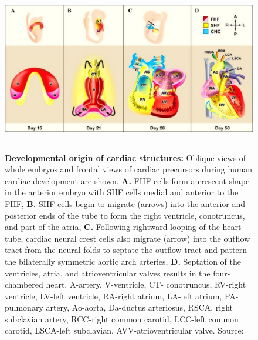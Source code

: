 \begin{refsection}
\begin{figure}[!tb]
\centering
\includegraphics[scale=0.5,keepaspectratio]{Figures/Figure1_1.pdf}
\rule{35em}{0.5pt}
\caption[Developmental origin of cardiac structures]{\textbf{Developmental origin of cardiac structures:} Oblique views of whole embryos and frontal views of cardiac precursors during human cardiac development are shown. \textbf{A.} FHF cells form a crescent shape in the anterior embryo with SHF cells medial and anterior to the FHF, \textbf{B.} SHF cells begin to migrate (arrows) into the anterior and posterior ends of the tube to form the right ventricle, conotruncus, and part of the atria, \textbf{C.} Following rightward looping of the heart tube, cardiac neural crest cells also migrate (arrow) into the outflow tract from the neural folds to septate the outflow tract and pattern the bilaterally symmetric aortic arch arteries, \textbf{D.} Septation of the ventricles, atria, and atrioventricular valves results in the four-chambered heart. 
 A-artery, V-ventricle, CT- conotruncus, RV-right ventricle, LV-left ventricle, RA-right atrium, LA-left atrium, PA-pulmonary artery, Ao-aorta, Da-ductus arteriosus, RSCA, right subclavian artery, RCC-right common carotid, LCC-left common carotid, LSCA-left subclavian, AVV-atrioventricular valve. Source: \cite{srivastava2006genetic}}
\label{fig:1_1}
\end{figure}


\end{refsection}
